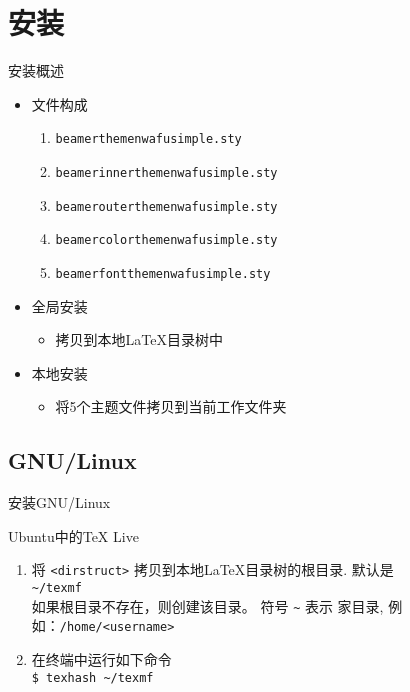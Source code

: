 \documentclass[xcolor=svgnames, t, aspectratio=169]{ctexbeamer}
\begin{document}
\section{安装}
\begin{frame}{安装}{概述}
  \begin{itemize}
  \item 文件构成
    \begin{enumerate}
    \item {\tt beamerthemenwafusimple.sty}
    \item {\tt beamerinnerthemenwafusimple.sty}
    \item {\tt beamerouterthemenwafusimple.sty}
    \item {\tt beamercolorthemenwafusimple.sty}
    \item {\tt beamerfontthemenwafusimple.sty}
    \end{enumerate}
  \item 全局安装
    \begin{itemize}
    \item 拷贝到本地\LaTeX 目录树中
    \end{itemize}
  \item 本地安装
    \begin{itemize}
    \item 将5个主题文件拷贝到当前工作文件夹
    \end{itemize}    
  \end{itemize}
\end{frame}

\subsection{GNU/Linux}
\begin{frame}{安装}{GNU/Linux}
  \begin{block}{Ubuntu中的TeX Live}
    \begin{enumerate}
    \item 将 {\tt <dirstruct>} 拷贝到本地{\LaTeX}目录树的根目录. 默认是\\
      {\tt \textasciitilde /texmf}\\
      如果根目录不存在，则创建该目录。 符号 {\tt \textasciitilde} 表示
      家目录, 例如：{\tt /home/<username>}
    \item 在终端中运行如下命令\\
      {\tt \$ texhash \textasciitilde /texmf}
    \end{enumerate}
  \end{block}
\end{frame}
\end{document}
